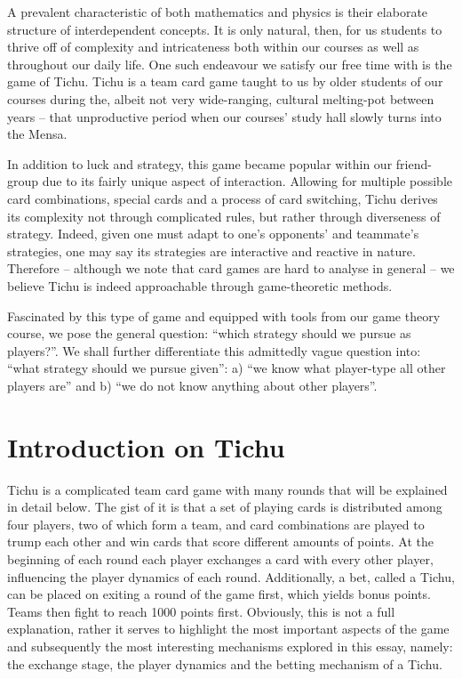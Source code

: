 A prevalent characteristic of both mathematics and physics is their elaborate structure of interdependent concepts. It is only natural, then, for us students to thrive off of complexity and intricateness both within our courses as well as throughout our daily life. One such endeavour we satisfy our free time with is the game of Tichu. Tichu is a team card game taught to us by older students of our courses during the, albeit not very wide-ranging, cultural melting-pot between years – that unproductive period when our courses’ study hall slowly turns into the Mensa. 

    In addition to luck and strategy, this game became popular within our friend-group due to its fairly unique aspect of interaction. Allowing for multiple possible card combinations, special cards and a process of card switching, Tichu derives its complexity not through complicated rules, but rather through diverseness of strategy. Indeed, given one must adapt to one’s opponents’ and teammate’s strategies, one may say its strategies are interactive and reactive in nature. Therefore – although we note that card games are hard to analyse in general – we believe Tichu is indeed approachable through game-theoretic methods. 

    Fascinated by this type of game and equipped with tools from our game theory course, we pose the general question: “which strategy should we pursue as players?”. We shall further differentiate this admittedly vague question into: “what strategy should we pursue given”: a) “we know what player-type all other players are” and b) “we do not know anything about other players”. 
\section{Introduction on Tichu}

Tichu is a complicated team card game with many rounds that will be explained in detail below. The gist of it is that a set of playing cards is distributed among four players, two of which form a team, and card combinations are played to trump each other and win cards that score different amounts of points. At the beginning of each round each player exchanges a card with every other player, influencing the player dynamics of each round. Additionally, a bet, called a Tichu, can be placed on exiting a round of the game first, which yields bonus points. Teams then fight to reach 1000 points first. Obviously, this is not a full explanation, rather it serves to highlight the most important aspects of the game and subsequently the most interesting mechanisms explored in this essay, namely: the exchange stage, the player dynamics and the betting mechanism of a Tichu. 

